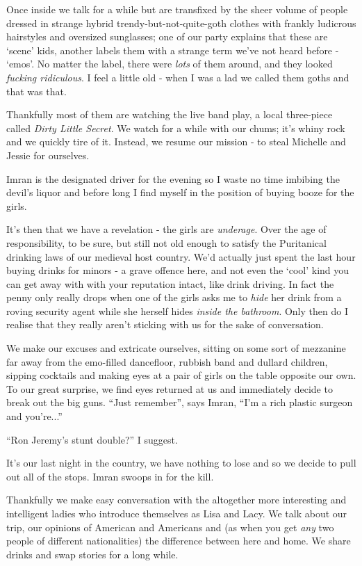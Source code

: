 \documentclass[a5paper,titlepage,11pt]{book}
\begin{document}
Once inside we talk for a while but are transfixed by the sheer volume of people dressed in strange hybrid trendy-but-not-quite-goth clothes with frankly ludicrous hairstyles and oversized sunglasses; one of our party explains that these are `scene' kids, another labels them with a strange term we've not heard before - `emos'.  No matter the label, there were \emph{lots} of them around, and they looked \emph{fucking ridiculous}.  I feel a little old - when I was a lad we called them goths and that was that.

Thankfully most of them are watching the live band play, a local three-piece called \emph{Dirty Little Secret}.  We watch for a while with our chums; it's whiny rock and we quickly tire of it.  Instead, we resume our mission - to steal Michelle and Jessie for ourselves.

Imran is the designated driver for the evening so I waste no time imbibing the devil's liquor and before long I find myself in the position of buying booze for the girls.

It's then that we have a revelation - the girls are \emph{underage}.  Over the age of responsibility, to be sure, but still not old enough to satisfy the Puritanical drinking laws of our medieval host country.  We'd actually just spent the last hour buying drinks for minors - a grave offence here, and not even the `cool' kind you can get away with with your reputation intact, like drink driving.  In fact the penny only really drops when one of the girls asks me to \emph{hide} her drink from a roving security agent while she herself hides \emph{inside the bathroom}.  Only then do I realise that they really aren't sticking with us for the sake of conversation.

We make our excuses and extricate ourselves, sitting on some sort of mezzanine far away from the emo-filled dancefloor, rubbish band and dullard children, sipping cocktails and making eyes at a pair of girls on the table opposite our own.  To our great surprise, we find eyes returned at us and immediately decide to break out the big guns.  ``Just remember'', says Imran, ``I'm a rich plastic surgeon and you're...''

``Ron Jeremy's stunt double?'' I suggest.

It's our last night in the country, we have nothing to lose and so we decide to pull out all of the stops.  Imran swoops in for the kill.

Thankfully we make easy conversation with the altogether more interesting and intelligent ladies who introduce themselves as Lisa and Lacy.  We talk about our trip, our opinions of American and Americans and (as when you get \emph{any} two people of different nationalities) the difference between here and home.  We share drinks and swap stories for a long while.
\end{document}
